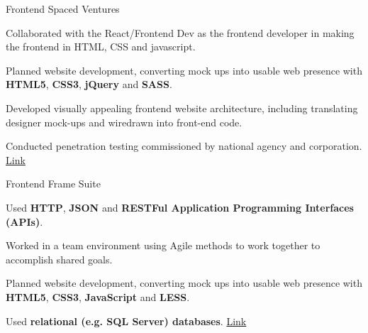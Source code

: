 

\begin{cventries}

  \cventry
    {Frontend} %
    {Spaced Ventures} %
    {} %
    {} %
    {
      \begin{cvitems} %
        \item {Collaborated with the React/Frontend Dev as the frontend developer in making the frontend in HTML, CSS and javascript.}
        \item {Planned website development, converting mock ups into usable web presence with \textbf{HTML5}, \textbf{CSS3}, \textbf{jQuery} and \textbf{SASS}.}
        \item {Developed visually appealing frontend website architecture, including translating designer mock-ups and wiredrawn into front-end code.}
        \item {Conducted penetration testing commissioned by national agency and corporation.}
        {\href{https://www.spacedventures.com/}{Link}}
      \end{cvitems}
    }

  \cventry
    {Frontend} %
    {Frame Suite} %
    {} %
    {} %
    {
      \begin{cvitems} %
        \item {Used \textbf{HTTP}, \textbf{JSON} and \textbf{RESTFul Application Programming Interfaces (APIs)}.}
        \item {Worked in a team environment using Agile methods to work together to accomplish shared goals.}
        \item {Planned website development, converting mock ups into usable web presence with \textbf{HTML5}, \textbf{CSS3}, \textbf{JavaScript} and \textbf{LESS}.}
        \item {Used \textbf{relational (e.g. SQL Server) databases}.}
        {\href{https://store.framesuite.com/}{Link}}
      \end{cvitems}
    }

\end{cventries}
